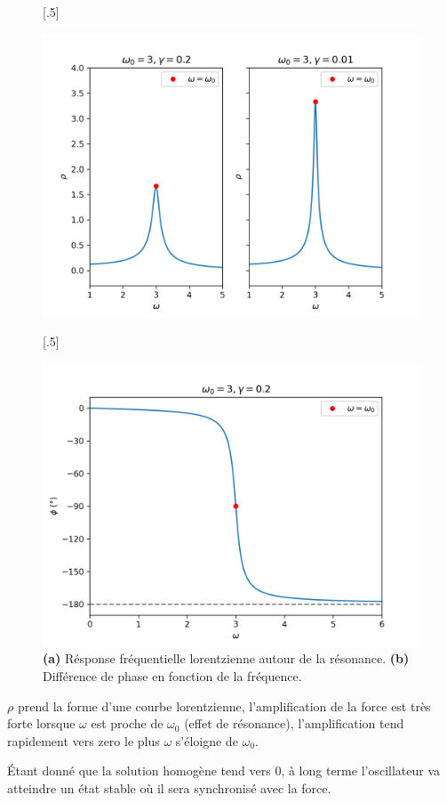 \begin{figure}[!t]
    
    \subcaptionbox{}[.5\linewidth]{%
      \includegraphics[width=\linewidth]{images/harmonique/rho_plot_contrast.png}%
      
    }%
    \hfill
    \subcaptionbox{}[.5\linewidth]{%
      \includegraphics[width=\linewidth]{images/harmonique/frequency_phase_shift.png}%
      
    }
    \caption{\textbf{(a)} Résponse fréquentielle lorentzienne autour de la résonance. \textbf{(b)} Différence de phase en fonction de la fréquence.}
\end{figure}



$\rho$ prend la forme d’une courbe lorentzienne, l’amplification 
de la force est très forte lorsque $\omega$ est proche de $\omega_0$ 
(effet de résonance), l’amplification tend rapidement vers zero 
le plus $\omega$ s’éloigne de $\omega_0$.

Étant donné que la solution homogène tend vers $0$, à long terme l'oscillateur va atteindre un état stable où il sera synchronisé avec la force.